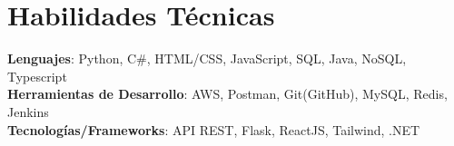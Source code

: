 \documentclass[letterpaper,11pt]{article}
\begin{document}
\section{Habilidades Técnicas}
 \begin{itemize}[leftmargin=0.15in, label={}]
    \small{\item{
     \textbf{Lenguajes}{: Python, C\#, HTML/CSS, JavaScript, SQL, Java, NoSQL, Typescript} \\
     \textbf{Herramientas de Desarrollo}{: AWS, Postman, Git(GitHub), MySQL, Redis, Jenkins} \\
     \textbf{Tecnologías/Frameworks}{: API REST, Flask, ReactJS, Tailwind, .NET} \\
    }}
 \end{itemize}
 \vspace{-16pt}


\end{document}
